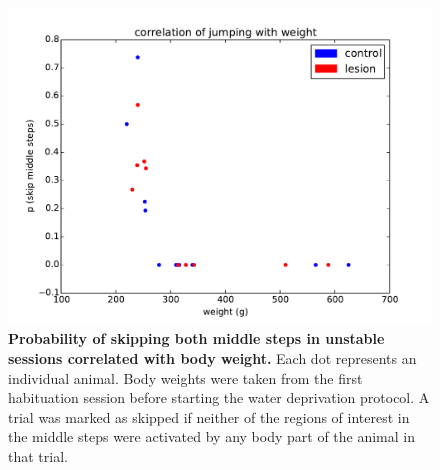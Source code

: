 \begin{figure}
\begin{center}
\includegraphics[width=\columnwidth]{chapters/figuresChBehaviour/correlationJumperWeight}
\end{center}
\vspace{-5mm}
\caption{\textbf{Probability of skipping both middle steps in unstable sessions correlated with body weight.} Each dot represents an individual animal. Body weights were taken from the first habituation session before starting the water deprivation protocol. A trial was marked as skipped if neither of the regions of interest in the middle steps were activated by any body part of the animal in that trial.}
\label{fig:correlationJumperWeight}
\end{figure}

